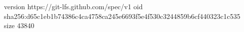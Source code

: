 version https://git-lfs.github.com/spec/v1
oid sha256:d65c1eb1b74386c4ca4758ca245e6693f5e4f530c3244859b6cf440323c1c535
size 43840
